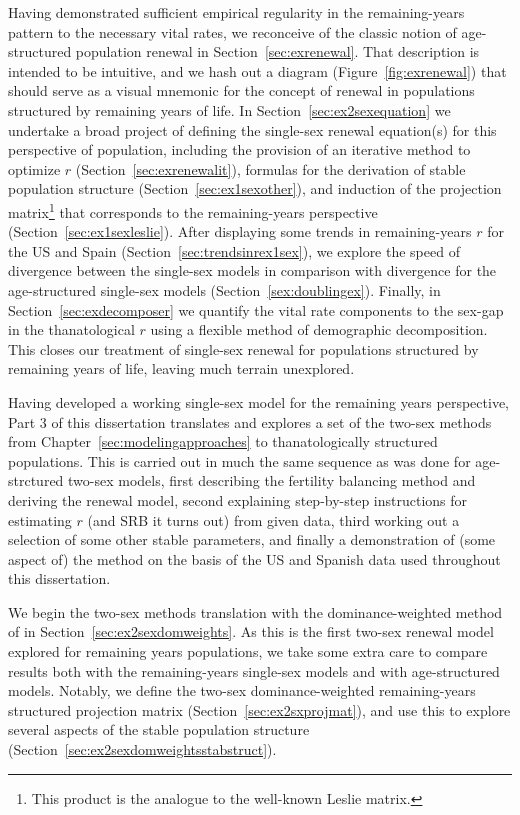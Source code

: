 Having demonstrated sufficient empirical regularity in the remaining-years
pattern to the necessary vital rates, we reconceive of the classic notion of
age-structured population renewal in Section~\ref{sec:exrenewal}. That
description is intended to be intuitive, and we hash out a diagram
(Figure~\ref{fig:exrenewal}) that should serve as a visual mnemonic for the 
concept of renewal in populations structured by remaining years of life. In
Section~\ref{sec:ex2sexequation} we undertake a broad project of defining the
single-sex renewal equation(s) for this perspective of population, including the
provision of an iterative method to optimize $r$
(Section~\ref{sec:exrenewalit}), formulas for the derivation of stable
population structure (Section~\ref{sec:ex1sexother}), and induction of the
projection matrix\footnote{This product is the analogue to the well-known Leslie
matrix.} that corresponds to the remaining-years perspective 
(Section~\ref{sec:ex1sexleslie}). After displaying some trends in
remaining-years $r$ for the US and Spain (Section~\ref{sec:trendsinrex1sex}),
 we explore the speed of divergence between the single-sex models in comparison with divergence for the age-structured
single-sex models (Section~\ref{sex:doublingex}). Finally, in
Section~\ref{sec:exdecomposer} we quantify the vital rate components to the
sex-gap in the thanatological $r$ using a flexible method of demographic
decomposition. This closes our treatment of single-sex renewal for populations
structured by remaining years of life, leaving much terrain unexplored.

Having developed a working single-sex model for the remaining years perspective,
Part 3 of this dissertation translates and explores a set of the two-sex
methods from Chapter~\ref{sec:modelingapproaches} to thanatologically
structured populations. This is carried out in much the same sequence as was
done for age-strctured two-sex models, first describing the fertility
balancing method and deriving the renewal model, second explaining step-by-step
instructions for estimating $r$ (and SRB it turns out) from given data, third
working out a selection of some other stable parameters, and
finally a demonstration of (some aspect of) the method on the basis of the US
and Spanish data used throughout this dissertation.

We begin the two-sex methods translation with the
dominance-weighted method of \citet{goodman1967age} in
Section~\ref{sec:ex2sexdomweights}. As this is the first two-sex renewal model
explored for remaining years populations, we take some extra care to compare
results both with the remaining-years single-sex models and with age-structured models. Notably, we
define the two-sex dominance-weighted remaining-years structured
projection matrix (Section~\ref{sec:ex2sxprojmat}), and use this to explore
several aspects of the stable population structure
(Section~\ref{sec:ex2sexdomweightsstabstruct}). 

